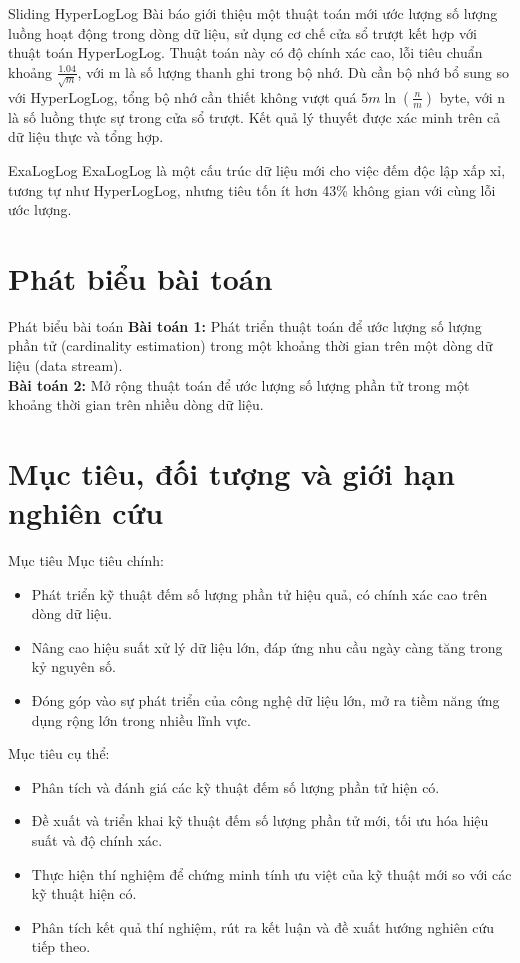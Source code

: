 \documentclass[10pt]{beamer}
\begin{document}
\begin{frame}[fragile]{Sliding HyperLogLog \cite{chabchoub2010sliding}}
  Bài báo giới thiệu một thuật toán mới ước lượng số lượng luồng hoạt động trong dòng dữ liệu, sử dụng cơ chế cửa sổ trượt kết hợp với 
  thuật toán HyperLogLog. Thuật toán này có độ chính xác cao, lỗi tiêu chuẩn khoảng $\frac{1.04}{\sqrt{m}}$, với m là số lượng thanh ghi trong bộ nhớ. Dù cần bộ nhớ bổ sung 
  so với HyperLogLog, tổng bộ nhớ cần thiết không vượt quá $5m\ln(\frac{n}{m})$ byte, với n là số luồng thực sự trong cửa sổ trượt. Kết quả lý thuyết được xác minh trên cả dữ liệu thực 
  và tổng hợp.
\end{frame}
\begin{frame}[fragile]{ExaLogLog \cite{ertl2024exaloglog}}
  ExaLogLog là một cấu trúc dữ liệu mới cho việc đếm độc lập xấp xỉ, tương tự như HyperLogLog, nhưng tiêu tốn ít hơn 43\% không gian với cùng lỗi ước lượng.
\end{frame}
\section{Phát biểu bài toán}
\begin{frame}[fragile]{Phát biểu bài toán}
\textbf{Bài toán 1:} Phát triển thuật toán để ước lượng số lượng phần tử (cardinality estimation) trong một khoảng thời gian trên một dòng dữ liệu (data stream).\\
\textbf{Bài toán 2:} Mở rộng thuật toán để ước lượng số lượng phần tử trong một khoảng thời gian trên nhiều dòng dữ liệu.
\end{frame}
\section{Mục tiêu, đối tượng và giới hạn nghiên cứu}
{
\begin{frame}{Mục tiêu}
  Mục tiêu chính:
  \begin{itemize}
      \item Phát triển kỹ thuật đếm số lượng phần tử hiệu quả, có chính xác cao trên dòng dữ liệu.
      \item Nâng cao hiệu suất xử lý dữ liệu lớn, đáp ứng nhu cầu ngày càng tăng trong kỷ nguyên số.
      \item Đóng góp vào sự phát triển của công nghệ dữ liệu lớn, mở ra tiềm năng ứng dụng rộng lớn trong nhiều lĩnh vực.
  \end{itemize}
  Mục tiêu cụ thể:
  \begin{itemize}
      \item Phân tích và đánh giá các kỹ thuật đếm số lượng phần tử hiện có.
      \item Đề xuất và triển khai kỹ thuật đếm số lượng phần tử mới, tối ưu hóa hiệu suất và độ chính xác.
      \item Thực hiện thí nghiệm để chứng minh tính ưu việt của kỹ thuật mới so với các kỹ thuật hiện có.
      \item Phân tích kết quả thí nghiệm, rút ra kết luận và đề xuất hướng nghiên cứu tiếp theo.
  \end{itemize}
\end{frame}
}
\end{document}
